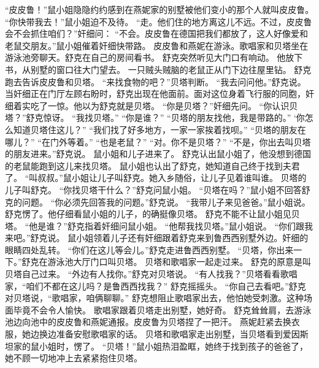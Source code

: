 \documentclass[a4paper,12pt,UTF8,twoside]{ctexbook}
\begin{document}
        “皮皮鲁！”鼠小姐隐隐约约感到在燕妮家的别墅被他们变小的那个人就叫皮皮鲁。  
        “你快带我去！”鼠小姐迫不及待。  
        “走。他们住的地方离这儿不远。不过，皮皮鲁会不会抓住咱们？”奸细问：  
        “不会。皮皮鲁在德国把我们都放了，这人好像爱和老鼠交朋友。”鼠小姐催着奸细快带路。  
        皮皮鲁和燕妮在游泳。歌唱家和贝塔坐在游泳池旁聊天。舒克在自己的房间看书。  
        舒克突然听见大门口有响动。  
        他放下书，从别墅的窗口往大门望去。  
        一只贼头贼脑的老鼠正从门下边往屋里钻。  
        舒克跑去告诉皮皮鲁和贝塔。  
        “来找食物的吧？”贝塔判断。  
        “我去问问他。”舒克说。  
        当奸细正在门厅左顾右盼时，舒克出现在他面前。面对这位身着飞行服的同胞，奸细着实吃了一惊。他以为舒克就是贝塔。  
        “你是贝塔？”奸细先问。  
        “你认识贝塔？”舒克惊讶。  
        “我找贝塔。”  
        “你是谁？”        
        “贝塔的朋友找他，我是带路的。”  
        ‘你怎么知道贝塔住这儿？”  
        “我们找了好多地方，一家一家挨着找呗。”  
        “贝塔的朋友在哪儿？”  
        “在门外等着。”  
        “也是老鼠？”  
        “对。你不是贝塔？”  
        “不是，你出去叫贝塔的朋友进来。”舒克说。  
        鼠小姐和儿子进来了。  
        舒克认出鼠小姐了，他没想到德国的老鼠能跑到这儿来找贝塔。  
        鼠小姐也认出了舒克，她知道自己终于找到夫君了。  
        “叫叔叔。”鼠小姐让儿子叫舒克。她入乡随俗，让儿子见着谁叫谁。  
        贝塔的儿子叫舒克。  
        “你找贝塔干什么？”舒克问鼠小姐。  
        “贝塔在吗？”鼠小姐不回答舒克的问题。  
        “你必须先回答我的问题。”舒克说。  
        “我带儿子来见爸爸。”鼠小姐说。  
        舒克愣了。他仔细看鼠小姐的儿子，的确挺像贝塔。  
        舒克不能不让鼠小姐见贝塔。  
        “他是谁？”舒克指着奸细问鼠小姐。        
        “他帮我找贝塔。”鼠小姐说。  
        “你们跟我来吧。”舒克说。  
        鼠小姐领着儿子还有奸细跟着舒克来到鲁西西别墅外边。奸细的眼睛四处乱转。  
        “你们在这儿等会儿。”舒克走进鲁西西别墅。  
        “贝塔，你出来一下。”舒克在游泳池大厅门口叫贝塔。  
        贝塔和歌唱家一起走过来。  
        舒克的原意是叫贝塔自己过来。  
        “外边有人找你。”舒克对贝塔说。  
        “有人找我？”贝塔看看歌唱家，“咱们不都在这儿吗？是鲁西西找我？”  
        舒克摇摇头。  
        “你自己去看吧。”舒克对贝塔说，“歌唱家，咱俩聊聊。”  
        舒克想阻止歌唱家出去，他怕她受刺激。这种场面毕竟不会令人愉快。  
        歌唱家跟着贝塔走出别墅，她好奇。  
        舒克耸耸肩，去游泳池边向池中的皮皮鲁和燕妮通报。皮皮鲁为贝塔捏了一把汗。  
        燕妮赶紧去换衣服，她边换边准备安慰歌唱家的话。  
        贝塔和歌唱家走出别墅，当贝塔看到爱因斯坦家的鼠小姐时，愣了。        
        “贝塔！”鼠小姐热泪盈眶，她终于找到孩子的爸爸了，她不顾一切地冲上去紧紧抱住贝塔。  
\end{document}
